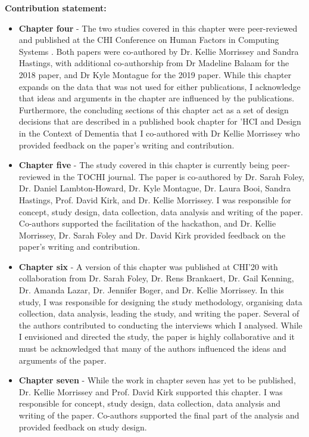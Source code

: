 \textbf{Contribution statement:} 
\begin{itemize}
    \item \textbf{Chapter four} - The two studies covered in this chapter were peer-reviewed and published at the CHI Conference on Human Factors in Computing Systems \citep{hodge_exploring_2018,hodge_exploring_2019}. Both papers were co-authored by Dr. Kellie Morrissey and Sandra Hastings, with additional co-authorship from Dr Madeline Balaam for the 2018 paper, and Dr Kyle Montague for the 2019 paper. While this chapter expands on the data that was not used for either publications, I acknowledge that ideas and arguments in the chapter are influenced by the publications. Furthermore, the concluding sections of this chapter act as a set of design decisions that are described in a published book chapter for 'HCI and Design in the Context of Dementia \citep{hodge2020sharing} that I co-authored with Dr Kellie Morrissey who provided feedback on the paper's writing and contribution. 

    \item \textbf{Chapter five} - The study covered in this chapter is currently being peer-reviewed in the TOCHI journal. The paper is co-authored by Dr. Sarah Foley, Dr. Daniel Lambton-Howard, Dr. Kyle Montague, Dr. Laura Booi, Sandra Hastings, Prof. David Kirk, and Dr. Kellie Morrissey. I was responsible for concept, study design, data collection, data analysis and writing of the paper. Co-authors supported the facilitation of the hackathon, and Dr. Kellie Morrissey, Dr. Sarah Foley and Dr. David Kirk provided feedback on the paper's writing and contribution.
    
    \item \textbf{Chapter six} - A version of this chapter was published at CHI'20 \citep{hodge_relational_2020} with collaboration from  Dr. Sarah Foley, Dr. Rens Brankaert, Dr. Gail Kenning, Dr. Amanda Lazar, Dr. Jennifer Boger, and Dr. Kellie Morrissey. In this study, I was responsible for designing the study methodology, organising data collection, data analysis, leading the study, and writing the paper. Several of the authors contributed to conducting the interviews which I analysed. While I envisioned and directed the study, the paper is highly collaborative and it must be acknowledged that many of the authors influenced the ideas and arguments of the paper.

    \item \textbf{Chapter seven} - While the work in chapter seven has yet to be published, Dr. Kellie Morrissey and Prof. David Kirk supported this chapter. I was responsible for concept, study design, data collection, data analysis and writing of the paper. Co-authors supported the final part of the analysis and provided feedback on study design.
\end{itemize}